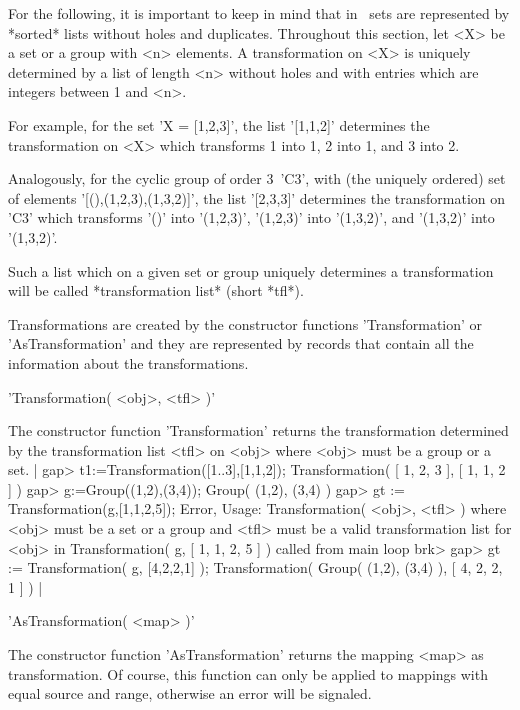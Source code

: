 For the following, it is important to keep 
in mind that in \GAP\ sets are represented by *sorted* lists without 
holes and duplicates. Throughout this section, let <X> be a set or a group 
with <n> elements. 
A transformation on <X> is uniquely determined by a list of length <n> 
without holes and with entries which are integers between 1 and <n>. 

For example, 
for the set 'X \:= [1,2,3]', the list '[1,1,2]' determines the 
transformation on <X> which transforms 1 into 1, 2 
into 1, and 3 into 2. 

Analogously, for the cyclic group of order 3\:\ 'C3', with 
(the uniquely ordered) set of elements 
'[(),(1,2,3),(1,3,2)]', the list '[2,3,3]' determines the 
transformation on 'C3' 
which transforms '()' into '(1,2,3)', '(1,2,3)' into 
'(1,3,2)', and '(1,3,2)' into '(1,3,2)'. 

Such a list which 
on a given set or group uniquely determines a transformation
will be called *transformation list* (short *tfl*).

Transformations are created by the constructor functions 
'Trans\-for\-ma\-tion' 
or 'As\-Trans\-for\-ma\-tion' and they are represented by records that 
contain all the information about the transformations.  

   
'Transformation( <obj>, <tfl> )'

The constructor function 'Transformation' returns the transformation 
determined by the transformation list <tfl> on <obj> where 
<obj> must be a group or a set.
|   
  gap> t1:=Transformation([1..3],[1,1,2]);
  Transformation( [ 1, 2, 3 ], [ 1, 1, 2 ] )
  gap> g:=Group((1,2),(3,4));
  Group( (1,2), (3,4) )
  gap> gt := Transformation(g,[1,1,2,5]);
  Error, Usage: Transformation( <obj>, <tfl> ) where <obj> must be a set
  or a group and <tfl> must be a valid transformation list for <obj> in
  Transformation( g, [ 1, 1, 2, 5 ] ) called from
  main loop
  brk>
  gap> gt := Transformation( g, [4,2,2,1] );
  Transformation( Group( (1,2), (3,4) ), [ 4, 2, 2, 1 ] )
|

   
'AsTransformation( <map> )'

The constructor function 'AsTransformation' returns the mapping <map> 
as transformation. Of course, this function can only be applied to mappings 
with equal source and range, otherwise an error will be signaled.

